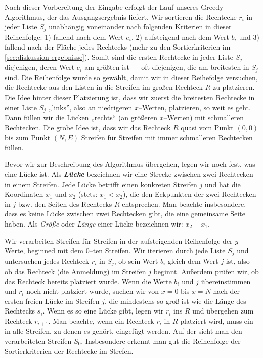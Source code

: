 Nach dieser Vorbereitung der Eingabe erfolgt der Lauf unseres Greedy--Algorithmus, der das
Ausgangsergebnis liefert.
Wir sortieren die Rechtecke $r_i$ in jeder Liste $S_j$ unabhängig voneinander nach folgenden Kriterien
in dieser Reihenfolge: 
1) fallend nach dem Wert $e_i$,
2) aufsteigend nach dem Wert $b_i$ und
3) fallend nach der Fläche jedes Rechtecks
(mehr zu den Sortierkriterien im \cref{sec:diskussion-ergebnisse}).
Somit sind die ersten Rechtecke in jeder Liste $S_j$ diejenigen,
deren Wert $e_i$ am größten ist --- oft diejenigen, die am breitesten in $S_j$ sind.
Die Reihenfolge wurde so gewählt, damit wir in dieser Reihefolge versuchen,
die Rechtecke aus den Listen in die Streifen im großen Rechteck $R$ zu platzieren.
Die Idee hinter dieser Platzierung ist, dass wir zuerst die breitesten Rechtecke in einer Liste $S_j$
„links”, also an niedrigeren $x$--Werten, platzieren, so weit es geht. Dann füllen wir 
die Lücken „rechts“ (an größeren $x$--Werten) mit schmalleren Rechtecken. 
Die grobe Idee ist, dass wir das Rechteck $R$ quasi vom Punkt $(0,0)$ bis zum Punkt
$(N, E)$ Streifen für Streifen mit immer schmalleren Rechtecken füllen.

Bevor wir zur Beschreibung des Algorithmus übergehen, legen wir noch fest, was
eine Lücke ist. Als \textbf{\textit{Lücke}} bezeichnen wir eine Strecke 
zwischen zwei Rechtecken in einem Streifen. Jede Lücke betrifft einen
konkreten Streifen $j$ und hat die Koordinaten $x_1$ und $x_2$ (stets: $x_1 < x_2$),
die den Eckpunkten der zwei Rechtecken in $j$ bzw. den Seiten des Rechtecks $R$ entsprechen.
Man beachte insbesondere, dass es keine Lücke zwischen zwei Rechtecken gibt,
die eine gemeinsame Seite haben.
Als \textit{Größe} oder \textit{Länge} einer Lücke bezeichnen wir: $x_2 - x_1$.



Wir verarbeiten Streifen für Streifen in der
aufsteigenden Reihenfolge der $y$--Werte, beginned mit dem 0--ten Streifen.
Wir iterieren durch jede Liste $S_j$ und untersuchen jedes Rechteck $r_i$ in $S_j$, ob sein Wert $b_i$ gleich dem Wert $j$ ist, also ob das Rechteck (die Anmeldung) im Streifen $j$ beginnt.
Außerdem prüfen wir, ob das Rechteck bereits platziert wurde.
Wenn die Werte $b_i$ und $j$ übereinstimmen und $r_i$ noch nicht platziert wurde, 
suchen wir von $x = 0$ bis $x = N$ nach der ersten freien Lücke im Streifen $j$,
die mindestens so groß ist wie die Länge des Rechtecks $s_i$. 
Wenn es so eine Lücke gibt, legen wir $r_i$ ins $R$ und übergehen zum Rechteck $r_{i+1}$.
Man beachte, wenn ein Rechteck $r_i$ in $R$ platziert wird, muss ein in alle Streifen,
zu denen es gehört, eingefügt werden.
Auf der  sieht man den verarbeiteten Streifen $S_0$.
Insbesondere erkennt man gut die Reihenfolge der Sortierkriterien der Rechtecke
im Strefen.

